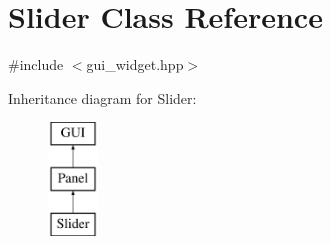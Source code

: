 \hypertarget{class_slider}{}\section{Slider Class Reference}
\label{class_slider}


{\ttfamily \#include $<$gui\+\_\+widget.\+hpp$>$}

Inheritance diagram for Slider\+:\begin{figure}[H]
\begin{center}
\leavevmode
\includegraphics[height=3.000000cm]{class_slider}
\end{center}
\end{figure}
